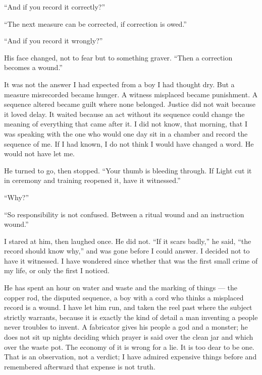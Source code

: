``And if you record it correctly?''\par

``The next measure can be corrected, if correction is owed.''\par

``And if you record it wrongly?''\par

His face changed, not to fear but to something graver. ``Then a correction becomes a wound.''\par

It was not the answer I had expected from a boy I had thought dry. But a measure misrecorded became hunger. A witness misplaced became punishment. A sequence altered became guilt where none belonged. Justice did not wait because it loved delay. It waited because an act without its sequence could change the meaning of everything that came after it. I did not know, that morning, that I was speaking with the one who would one day sit in a chamber and record the sequence of me. If I had known, I do not think I would have changed a word. He would not have let me.\par

He turned to go, then stopped. ``Your thumb is bleeding through. If Light cut it in ceremony and training reopened it, have it witnessed.''\par

``Why?''\par

``So responsibility is not confused. Between a ritual wound and an instruction wound.''\par

I stared at him, then laughed once. He did not. ``If it scars badly,'' he said, ``the record should know why,'' and was gone before I could answer. I decided not to have it witnessed. I have wondered since whether that was the first small crime of my life, or only the first I noticed.\par

\ornament

\noindent He has spent an hour on water and waste and the marking of things --- the copper rod, the disputed sequence, a boy with a cord who thinks a misplaced record is a wound. I have let him run, and taken the reel past where the subject strictly warrants, because it is exactly the kind of detail a man inventing a people never troubles to invent. A fabricator gives his people a god and a monster; he does not sit up nights deciding which prayer is said over the clean jar and which over the waste pot. The economy of it is wrong for a lie. It is too dear to be one. That is an observation, not a verdict; I have admired expensive things before and remembered afterward that expense is not truth.\par

